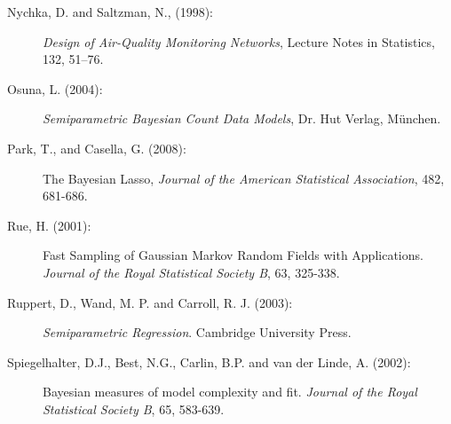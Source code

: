 \documentclass[11pt,a4paper,twoside]{bayesxarticle}
\begin{document}
\begin{description}
\item[Nychka, D. and Saltzman, N., (1998):]
{\it Design of Air-Quality Monitoring Networks},
Lecture Notes in Statistics, 132, 51--76.

\item[Osuna, L. (2004):] {\it Semiparametric Bayesian Count Data
Models}, Dr. Hut Verlag, M\"{u}nchen.

\item[Park, T., and Casella, G. (2008):] The Bayesian Lasso, {\em Journal 
of the American Statistical Association}, 482, 681-686.

\item[Rue, H. (2001):] Fast Sampling of Gaussian Markov Random Fields with Applications.
{\em Journal of the Royal Statistical Society B}, 63, 325-338.

\item[Ruppert, D., Wand, M. P. and Carroll, R. J. (2003):] {\em Semiparametric Regression}.
Cambridge University Press.

\item[Spiegelhalter, D.J., Best, N.G., Carlin, B.P. and van der Linde, A. (2002):]
Bayesian measures of model complexity and fit. {\em Journal of the
Royal Statistical Society B}, 65, 583-639.



\end{description}

%
\hypertarget{index}{}
\end{document}

